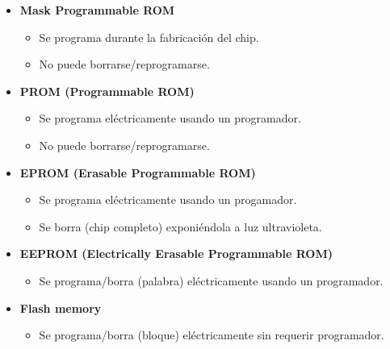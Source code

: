 \documentclass[a4paper,10pt]{book}
\begin{document}
\begin{itemize}
\item \textbf{Mask Programmable ROM}
	\begin{itemize}
	\item Se programa durante la fabricación del chip.
	\item No puede borrarse/reprogramarse.
	\end{itemize}
\item \textbf{PROM (Programmable ROM)}
	\begin{itemize}
	\item Se programa eléctricamente usando un programador.
	\item No puede borrarse/reprogramarse.
	\end{itemize}
\item \textbf{EPROM (Erasable Programmable ROM)}
	\begin{itemize}
	\item Se programa eléctricamente usando un progamador.
	\item Se borra (chip completo) exponiéndola a luz ultravioleta.
	\end{itemize}
\item \textbf{EEPROM (Electrically Erasable Programmable ROM)}
	\begin{itemize}
	\item Se programa/borra (palabra) eléctricamente usando un programador.
	\end{itemize}
\item \textbf{Flash memory}
	\begin{itemize}
	\item Se programa/borra (bloque) eléctricamente sin requerir programador.
	\end{itemize}
\end{itemize}
\end{document}
